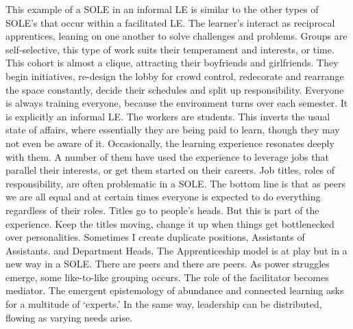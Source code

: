 This example of a SOLE in an informal LE is similar to the other types
of SOLE's that occur within a facilitated LE. The learner's interact as
reciprocal apprentices, leaning on one another to solve challenges and
problems. Groups are self-selective, this type of work suits their
temperament and interests, or time. This cohort is almost a clique,
attracting their boyfriends and girlfriends. They begin initiatives,
re-design the lobby for crowd control, redecorate and rearrange the
space constantly, decide their schedules and split up responsibility.
Everyone is always training everyone, because the environment turns over
each semester. It is explicitly an informal LE. The workers are
students. This inverts the usual state of affairs, where essentially
they are being paid to learn, though they may not even be aware of it.
Occasionally, the learning experience resonates deeply with them. A
number of them have used the experience to leverage jobs that parallel
their interests, or get them started on their careers. Job titles, roles
of responsibility, are often problematic in a SOLE. The bottom line is
that as peers we are all equal and at certain times everyone is expected
to do everything regardless of their roles. Titles go to people's heads.
But this is part of the experience. Keep the titles moving, change it up
when things get bottlenecked over personalities. Sometimes I create
duplicate positions, Assistants of Assistants. and Department Heads. The
Apprenticeship model is at play but in a new way in a SOLE. There are
peers and there are peers. As power struggles emerge, some like-to-like
grouping occurs. The role of the facilitator becomes mediator. The
emergent epistemology of abundance and connected learning asks for a
multitude of `experts.' In the same way, leadership can be distributed,
flowing as varying needs arise.

